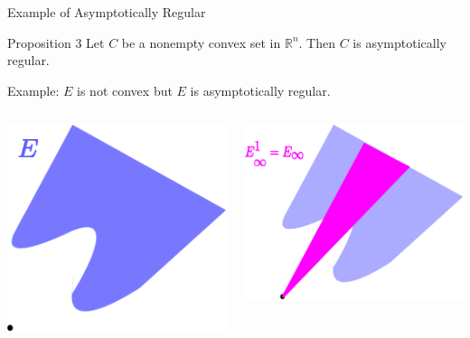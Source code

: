 \documentclass[aspectratio=169, dvipdfmx, 11pt]{beamer} %
\newcommand{\NDemenstionalRealEuclidianSpace}{\mathbb{R}^n}
\begin{document}
\begin{frame}{Example of Asymptotically Regular}
    \begin{block}{Proposition 3}
        Let $C$ be a nonempty convex set in $\NDemenstionalRealEuclidianSpace$. Then $C$ is asymptotically regular.
    \end{block}

    Example: $E$ is not convex but $E$ is asymptotically regular.

    \medskip

    \centering
    \begin{columns}
        \begin{column}{0.48\textwidth}
        \centering
        \includegraphics[keepaspectratio, scale=0.095]{figures/example_not_convex_asymptotically_regular_1.eps}
        \end{column}
        \pause
        \begin{column}{0.48\textwidth}
        \centering
        \includegraphics[keepaspectratio, scale=0.095]{figures/example_not_convex_asymptotically_regular_2.eps}

\end{column}
\end{columns}
\end{frame}
\end{document}
